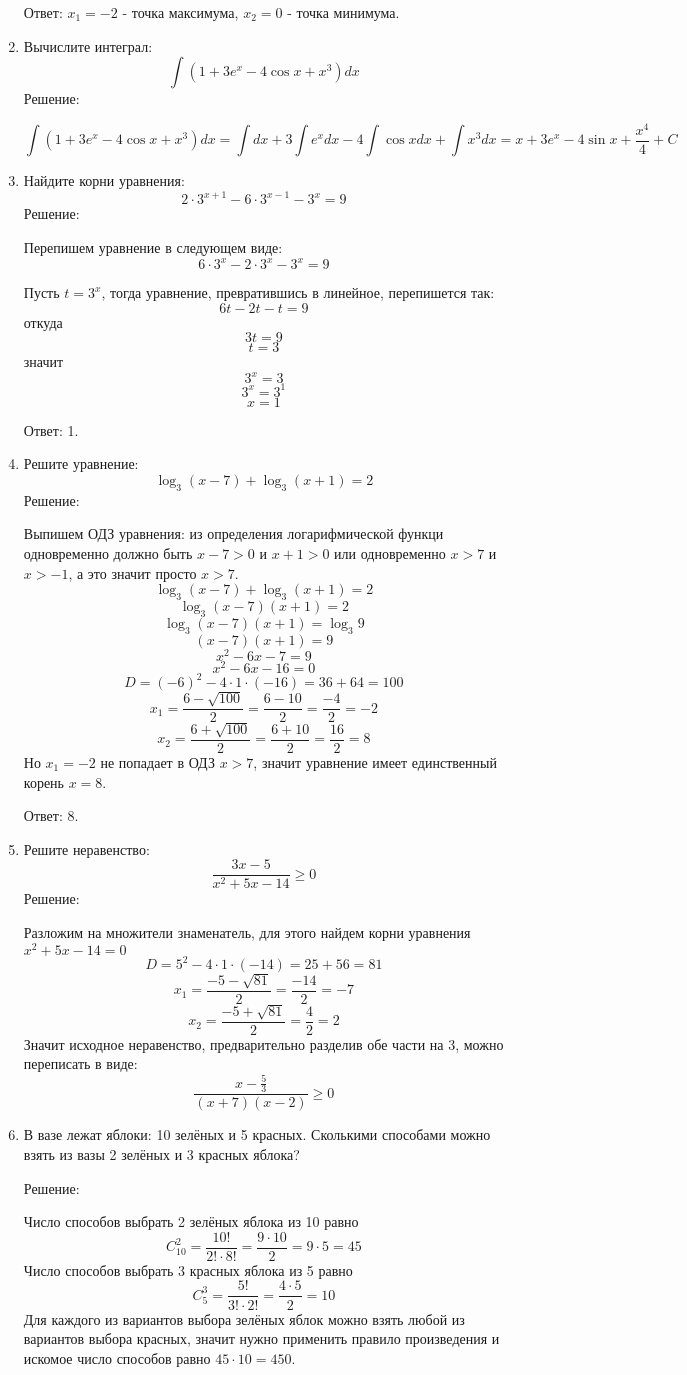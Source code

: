 \documentclass{article}
\renewcommand{\ge}{\ensuremath{\geqslant}}
\begin{document}
\begin{enumerate}
Ответ: $x_1=-2$ - точка максимума, $x_2=0$ - точка минимума.
\item %
Вычислите интеграл:
$$\int{\left(1+3e^x-4\cos{x}+x^3\right)dx}$$
Решение:

$$\int{\left(1+3e^x-4\cos{x}+x^3\right)dx}=\int{dx}+3\int{e^x dx}-4\int{\cos{x}dx}+\int{x^3dx}=x+3e^x-4\sin{x}+\frac{x^4}{4}+C$$

\item %
Найдите корни уравнения:
$$2\cdot3^{x+1}-6\cdot3^{x-1}-3^x=9$$
Решение:

Перепишем уравнение в следующем виде: $$6\cdot3^{x}-2\cdot3^{x}-3^x=9$$

Пусть $t=3^x$, тогда уравнение, превратившись в линейное, перепишется так: $$6t-2t-t=9$$ откуда $$3t=9$$ $$t=3$$ значит $$3^x=3$$ $$3^x=3^1$$ $$x=1$$

Ответ: 1.

\item %
Решите уравнение:
$$\log_3{(x-7)}+\log_3{(x+1)}=2$$
Решение:

Выпишем ОДЗ уравнения: из определения логарифмической функци одновременно должно быть $x-7>0$ и $x+1>0$ или  одновременно $x>7$ и $x>-1$, а это значит просто $x>7$.
$$\log_3{(x-7)}+\log_3{(x+1)}=2$$
$$\log_3{(x-7)(x+1)}=2$$
$$\log_3{(x-7)(x+1)}=\log_3{9}$$
$$(x-7)(x+1)=9$$
$$x^2-6x-7=9$$
$$x^2-6x-16=0$$
$$D=(-6)^2-4\cdot1\cdot(-16)=36+64=100$$
$$x_1=\frac{6-\sqrt{100}}{2}=\frac{6-10}{2}=\frac{-4}{2}=-2$$
$$x_2=\frac{6+\sqrt{100}}{2}=\frac{6+10}{2}=\frac{16}{2}=8$$
Но $x_1=-2$ не попадает в ОДЗ $x>7$, значит уравнение имеет единственный корень $x=8$.

Ответ: 8.
\item %
Решите неравенство:
$$\frac{3x-5}{x^2+5x-14}\ge0$$
Решение:

Разложим на множители знаменатель, для этого найдем корни уравнения $x^2+5x-14=0$ $$D=5^2-4\cdot1\cdot(-14)=25+56=81$$ $$x_1=\frac{-5-\sqrt{81}}{2}=\frac{-14}{2}=-7$$ $$x_2=\frac{-5+\sqrt{81}}{2}=\frac{4}{2}=2$$
Значит исходное неравенство, предварительно разделив обе части на 3, можно переписать в виде:
$$\frac{x-\frac{5}{3}}{(x+7)(x-2)}\ge0$$

\item %
В вазе лежат яблоки: 10 зелёных и 5 красных. Сколькими способами можно взять из вазы 2 зелёных и 3 красных яблока?

Решение:

Число способов выбрать 2 зелёных яблока из 10 равно $$C_{10}^2=\frac{10!}{2!\cdot8!}=\frac{9\cdot10}{2}=9\cdot5=45$$
Число способов выбрать 3 красных яблока из 5 равно
$$C_{5}^3=\frac{5!}{3!\cdot2!}=\frac{4\cdot5}{2}=10$$
Для каждого из вариантов выбора зелёных яблок можно взять любой из вариантов выбора красных, значит нужно применить правило произведения и искомое число способов равно $45\cdot10=450$.


\end{enumerate}
\end{document}
